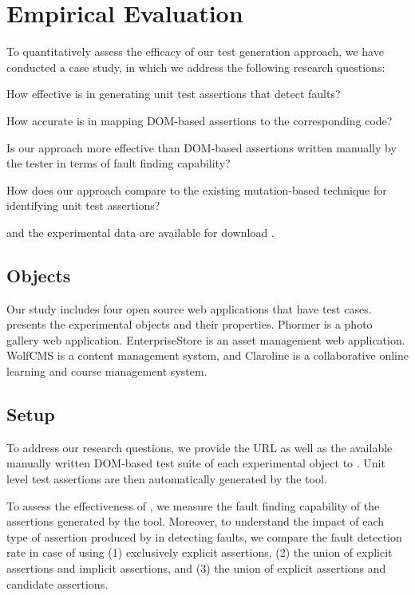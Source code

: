 \section{Empirical Evaluation} \label{Sec:evaluation}
To quantitatively assess the efficacy of our test generation approach, we have conducted a case study, in which we address the following research questions:

\begin{description}[noitemsep]
\item [RQ1] How effective is \tool in generating unit test assertions that detect faults?
\item [RQ2] How accurate is \tool in mapping DOM-based assertions to the corresponding \javascript code?
\item [RQ3] Is our approach more effective than DOM-based assertions written manually by the tester in terms of fault finding capability?
\item [RQ4] How does our approach compare to the existing mutation-based technique for identifying unit test assertions?
\end{description}

\tool and the experimental data are available for download \cite{atrina-dl}.
\subsection{Objects}
Our study includes four open source \javascript web applications that have \selenium test cases.  presents the experimental objects and their properties. Phormer \cite{phormer} is a photo gallery web application. EnterpriseStore \cite{enterpriseStore} is an asset management web application. WolfCMS \cite{wolfcms} is a content management system, and Claroline \cite{claroline} is a collaborative online learning and course management system. 

\subsection{Setup} \label{Sec:setup}
To address our research questions, we provide the URL as well as the available manually written DOM-based test suite of each experimental object to \tool. Unit level test assertions are then automatically generated by the tool.

 To assess the effectiveness of \tool, we measure the fault finding capability of the assertions generated by the tool. Moreover, to understand the impact of each type of assertion produced by \tool in detecting faults, we compare the fault detection rate in case of using (1) exclusively explicit assertions, (2) the union of explicit assertions and implicit assertions, and (3) the
union of explicit assertions and candidate assertions.
       

